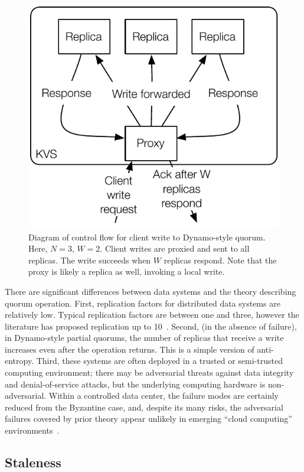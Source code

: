 \documentclass{vldb}
\begin{document}
\begin{figure}
\centering
\includegraphics[width=.8\columnwidth]{figs/dynamo-quorum.pdf}
\caption{Diagram of control flow for client write to Dynamo-style
  quorum.  Here, $N=3$, $W=2$. Client writes are proxied and sent to
  all replicas. The write succeeds when $W$ replicas respond.  Note
  that the proxy is likely a replica as well, invoking a local write.}
\label{fig:dynamo-quorum}
\end{figure}

There are significant differences between data systems and the theory
describing quorum operation.  First, replication factors for
distributed data systems are relatively low.  Typical replication
factors are between one and three, however the literature has proposed
replication up to 10~\cite{chain-replication}.  Second, (in the
absence of failure), in Dynamo-style partial quorums, the number of
replicas that receive a write increases even after the operation
returns.  This is a simple version of anti-entropy.  Third, these
systems are often deployed in a trusted or semi-trusted computing
environment; there may be adversarial threats against data integrity
and denial-of-service attacks, but the underlying computing hardware
is non-adversarial. Within a controlled data center, the failure modes
are certainly reduced from the Byzantine case, and, despite its many
risks, the adversarial failures covered by prior theory appear
unlikely in emerging ``cloud computing'' environments~\cite{needed}.

\subsection{Staleness}
\end{document}
